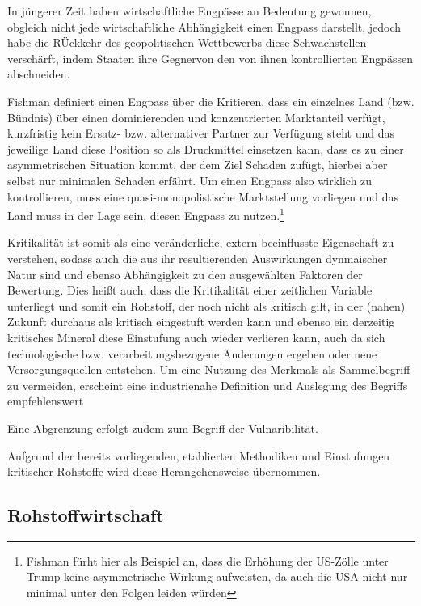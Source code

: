 \documentclass[12pt,a4paper,oneside]{book} %
\begin{document}
In jüngerer Zeit haben wirtschaftliche Engpässe an Bedeutung gewonnen, obgleich nicht jede wirtschaftliche Abhängigkeit einen Engpass darstellt, jedoch habe die RÜckkehr des geopolitischen Wettbewerbs diese Schwachstellen verschärft, indem Staaten ihre \glqq Gegner\grqq von den von ihnen kontrollierten Engpässen abschneiden.\autocite{Edward Fishman, How to Fight an Economic War}

Fishman definiert einen Engpass über die Kritieren, dass ein einzelnes Land (bzw. Bündnis) über einen dominierenden und konzentrierten Marktanteil verfügt, kurzfristig kein Ersatz- bzw. alternativer Partner zur Verfügung steht und das jeweilige Land diese Position so als Druckmittel einsetzen kann, dass es zu einer asymmetrischen Situation kommt, der dem Ziel Schaden zufügt, hierbei aber selbst nur minimalen Schaden erfährt.\autocite{Fishman} Um einen Engpass also wirklich zu kontrollieren, muss eine quasi-monopolistische Marktstellung vorliegen und das Land muss in der Lage sein, diesen Engpass zu nutzen.\footnote{Fishman fürht hier als Beispiel an, dass die Erhöhung der US-Zölle unter Trump keine asymmetrische Wirkung aufweisten, da auch die USA nicht nur minimal unter den Folgen leiden würden}

Kritikalität ist somit als eine veränderliche, extern beeinflusste Eigenschaft zu verstehen, sodass auch die aus ihr resultierenden Auswirkungen dynmaischer Natur sind und ebenso Abhängigkeit zu den ausgewählten Faktoren der Bewertung. Dies heißt auch, dass die Kritikalität einer zeitlichen Variable unterliegt und somit ein Rohstoff, der noch nicht als kritisch gilt, in der (nahen) Zukunft durchaus als kritisch eingestuft werden kann und ebenso ein derzeitig kritisches Mineral diese Einstufung auch wieder verlieren kann, auch da sich technologische bzw. verarbeitungsbezogene Änderungen ergeben oder neue Versorgungsquellen entstehen.\autocite{IEA Global Energy Review 2026} Um eine Nutzung des Merkmals als Sammelbegriff zu vermeiden, erscheint eine industrienahe Definition und Auslegung des Begriffs empfehlenswert

Eine Abgrenzung erfolgt zudem zum Begriff der Vulnaribilität.

Aufgrund der bereits vorliegenden, etablierten Methodiken und Einstufungen kritischer Rohstoffe wird diese Herangehensweise übernommen.
	

	
	\subsection{Rohstoffwirtschaft}
	
\end{document}
